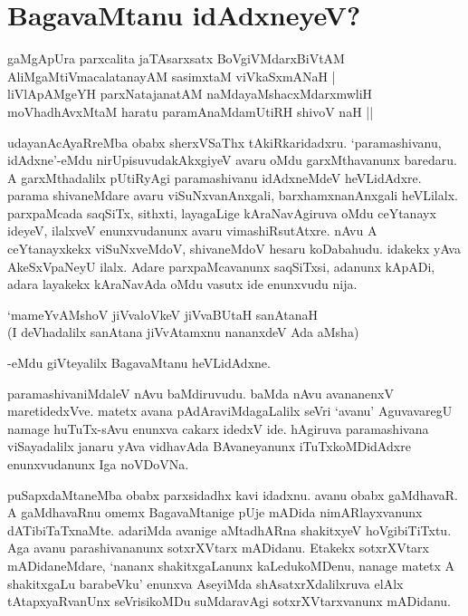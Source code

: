 \chapter{BagavaMtanu idAdxneyeV?}\label{chap8}

\begin{shloka}
gaMgApUra parxcalita jaTAsarxsatx BoVgiVMdarxBiVtAM\\
AliMgaMtiVmacalatanayAM sasimxtaM viVkaSxmANaH |\\
liVlApAMgeYH parxNatajanatAM naMdayaMshacxMdarxmwliH\\
moVhadhAvxMtaM haratu paramAnaMdamUtiRH shivoV naH ||
\end{shloka}

udayanAcAyaRreMba obabx sherxVSaThx tAkiRkaridadxru. `paramashivanu, idAdxne'-eMdu nirUpisuvudakAkxgiyeV avaru oMdu garxMthavanunx baredaru. A garxMthadalilx pUtiRyAgi paramashivanu idAdxneMdeV heVLidAdxre. parama shivaneMdare avaru viSuNxvanAnxgali, barxhamxnanAnxgali heVLilalx. parxpaMcada saqSiTx, sithxti, layagaLige kAraNavAgiruva oMdu ceYtanayx ideyeV, ilalxveV enunxvudanunx avaru vimashiRsutAtxre. nAvu A ceYtanayxkekx viSuNxveMdoV, shivaneMdoV hesaru koDabahudu. idakekx yAva AkeSxVpaNeyU ilalx. Adare parxpaMcavanunx saqSiTxsi, adanunx kApADi, adara layakekx kAraNavAda oMdu vasutx ide enunxvudu nija.

\begin{shloka}
`mameYvAMshoV jiVvaloVkeV jiVvaBUtaH sanAtanaH\\
(I deVhadalilx sanAtana jiVvAtamxnu nananxdeV Ada aMsha)
\end{shloka}

-eMdu giVteyalilx BagavaMtanu heVLidAdxne.

paramashivaniMdaleV nAvu baMdiruvudu. baMda nAvu avananenxV maretidedxVve. matetx avana pAdAraviMdagaLalilx seVri `avanu' AguvavaregU namage huTuTx-sAvu enunxva cakarx idedxV ide. hAgiruva paramashivana viSayadalilx janaru yAva vidhavAda BAvaneyanunx iTuTxkoMDidAdxre enunxvudanunx Iga noVDoVNa.

puSapxdaMtaneMba obabx parxsidadhx kavi idadxnu. avanu obabx gaMdhavaR. A gaMdhavaRnu omemx BagavaMtanige pUje mADida nimARlayxvanunx dATibiTaTxnaMte. adariMda avanige aMtadhARna shakitxyeV hoVgibiTiTxtu. Aga avanu parashivananunx sotxrXVtarx mADidanu. Etakekx sotxrXVtarx mADidaneMdare, `nananx shakitxgaLanunx kaLedukoMDenu, nanage matetx A shakitxgaLu barabeVku' enunxva AseyiMda shAsatxrXdalilxruva elAlx tAtapxyaRvanUnx seVrisikoMDu suMdaravAgi sotxrXVtarxvanunx mADidanu.

